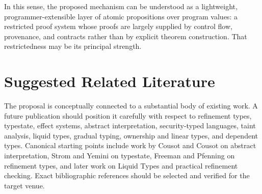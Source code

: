 \documentclass[11pt]{article}
\begin{document}
In this sense, the proposed mechanism can be understood as a lightweight, programmer-extensible layer of atomic propositions over program values: a restricted proof system whose proofs are largely supplied by control flow, provenance, and contracts rather than by explicit theorem construction. That restrictedness may be its principal strength.

\section*{Suggested Related Literature}
The proposal is conceptually connected to a substantial body of existing work. A future publication should position it carefully with respect to refinement types, typestate, effect systems, abstract interpretation, security-typed languages, taint analysis, liquid types, gradual typing, ownership and linear types, and dependent types. Canonical starting points include work by Cousot and Cousot on abstract interpretation, Strom and Yemini on typestate, Freeman and Pfenning on refinement types, and later work on Liquid Types and practical refinement checking. Exact bibliographic references should be selected and verified for the target venue.
\end{document}
